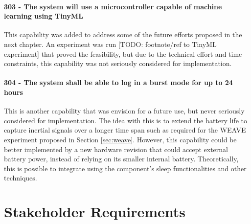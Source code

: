 \paragraph*{303 - The system will use a microcontroller capable of machine learning using TinyML} This capability was added to address some of the future efforts proposed in the next chapter.
An experiment was run [TODO: footnote/ref to TinyML experiment] that proved the feasibility, but due to the technical effort and time constraints, this capability was not seriously considered for implementation.

\paragraph*{304 - The system shall be able to log in a burst mode for up to 24 hours} This is another capability that was envision for a future use, but never seriously considered for implementation.
The idea with this is to extend the battery life to capture inertial signals over a longer time span such as required for the WEAVE experiment proposed in Section \ref{sec:weave}.
However, this capability could be better implemented by a new hardware revision that could accept external battery power, instead of relying on its smaller internal battery.
Theoretically, this is possible to integrate using the component's sleep functionalities and other techniques.

\section{Stakeholder Requirements}

